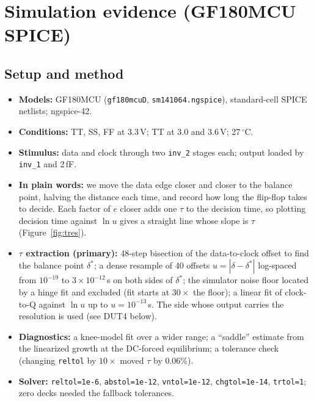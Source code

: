\documentclass[11pt]{article}
\begin{document}
\section{Simulation evidence (GF180MCU SPICE)}
\label{sec:evidence}
\subsection{Setup and method}
\begin{itemize}
\item \textbf{Models:} GF180MCU (\texttt{gf180mcuD}, \texttt{sm141064.ngspice}), standard-cell SPICE netlists; ngspice-42.
\item \textbf{Conditions:} TT, SS, FF at 3.3\,V; TT at 3.0 and 3.6\,V; 27\,$^\circ$C.
\item \textbf{Stimulus:} data and clock through two \texttt{inv\_2} stages each; output loaded by \texttt{inv\_1} and 2\,fF.
\item \textbf{In plain words:} we move the data edge closer and closer to the balance point, halving the distance
  each time, and record how long the flip-flop takes to decide. Each factor of $e$ closer adds one $\tau$ to the
  decision time, so plotting decision time against $\ln u$ gives a straight line whose slope is $\tau$
  (Figure~\ref{fig:tres}).
\item \textbf{$\tau$ extraction (primary):} 48-step bisection of the data-to-clock offset to find the balance point
  $\delta^*$; a dense resample of 40 offsets $u=|\delta-\delta^*|$ log-spaced from $10^{-19}$ to $3\times10^{-12}$\,s on
  both sides of $\delta^*$; the simulator noise floor located by a hinge fit and excluded (fit starts at
  $30\times$ the floor); a linear fit of clock-to-Q against $\ln u$ up to $u=10^{-13}$\,s. The side whose output
  carries the resolution is used (see DUT4 below).
\item \textbf{Diagnostics:} a knee-model fit over a wider range; a ``saddle'' estimate from the linearized growth
  at the DC-forced equilibrium; a tolerance check (changing \texttt{reltol} by $10\times$ moved $\tau$ by 0.06\%).
\item \textbf{Solver:} \texttt{reltol=1e-6}, \texttt{abstol=1e-12}, \texttt{vntol=1e-12}, \texttt{chgtol=1e-14}, \texttt{trtol=1}; zero decks needed the
  fallback tolerances.
\end{itemize}
\end{document}
